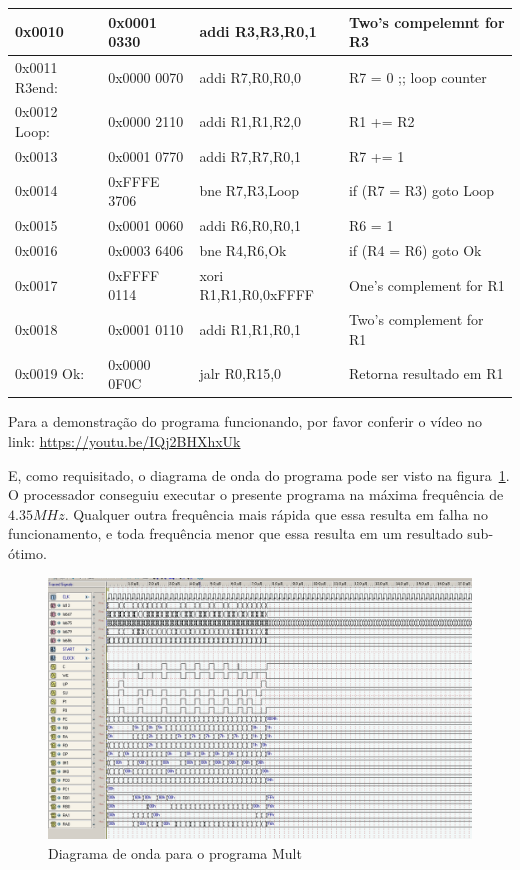\documentclass[12pt]{article}
\begin{document}
\begin{table}[H]
\begin{tabular}{|l|l|l|l|}
        0x0010        & 0x0001 0330 & addi R3,R3,R0,1      & Two's compelemnt for R3        \\\hline
        0x0011 R3end: & 0x0000 0070 & addi R7,R0,R0,0      & R7 = 0 ;; loop counter         \\\hline
        0x0012 Loop:  & 0x0000 2110 & addi R1,R1,R2,0      & R1 += R2                       \\\hline
        0x0013        & 0x0001 0770 & addi R7,R7,R0,1      & R7 += 1                        \\\hline
        0x0014        & 0xFFFE 3706 & bne  R7,R3,Loop      & if (R7 \!= R3) goto Loop       \\\hline
        0x0015        & 0x0001 0060 & addi R6,R0,R0,1      & R6 = 1                         \\\hline
        0x0016        & 0x0003 6406 & bne  R4,R6,Ok        & if (R4 \!= R6) goto Ok         \\\hline
        0x0017        & 0xFFFF 0114 & xori R1,R1,R0,0xFFFF & One's complement for R1        \\\hline
        0x0018        & 0x0001 0110 & addi R1,R1,R0,1      & Two's complement for R1        \\\hline
        0x0019 Ok:    & 0x0000 0F0C & jalr R0,R15,0        & Retorna resultado em R1        \\\hline
    \end{tabular}\label{tab:programs:mult}
\end{table}

Para a demonstração do programa funcionando, por favor conferir o vídeo no link:
\href{https://youtu.be/IQj2BHXhxUk}{https://youtu.be/IQj2BHXhxUk}

E, como requisitado, o diagrama de onda do programa pode ser visto na
figura~\ref{fig:program__mult_wave.png}. O processador conseguiu executar o
presente programa na máxima frequência de $4.35MHz$. Qualquer outra frequência
mais rápida que essa resulta em falha no funcionamento, e toda frequência menor
que essa resulta em um resultado sub-ótimo.

\begin{figure}[H]
    \centering
    \includegraphics[width=.9\textwidth]{Projeto/images/program__mult_wave.png}
    \caption{Diagrama de onda para o programa Mult}\label{fig:program__mult_wave.png}
\end{figure}
\end{document}
